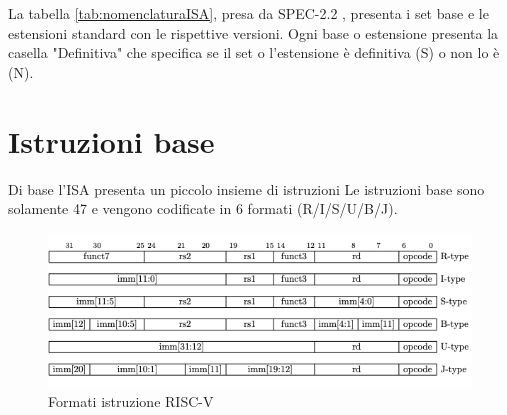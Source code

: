 \documentclass[12pt, a4paper]{report}
\begin{document}
La tabella \ref{tab:nomenclaturaISA}, presa da SPEC-2.2 \cite{ISA}, presenta i set base e le estensioni standard con le rispettive versioni. Ogni base o estensione presenta la casella "Definitiva" che specifica se il set o l'estensione è definitiva (S) o non lo è (N).


\section{Istruzioni base}
Di base l'ISA presenta un piccolo insieme di istruzioni Le istruzioni base sono solamente 47 e vengono codificate in 6 formati (R/I/S/U/B/J). 

\begin{figure}[h!]
	\includegraphics[width = \textwidth]{FormatiIstruzione.png}
	\caption{Formati istruzione RISC-V\cite{ISA}}
	\label{Fig:Formati_istruzioni_RV32I}
	
\end{figure}
\end{document}
